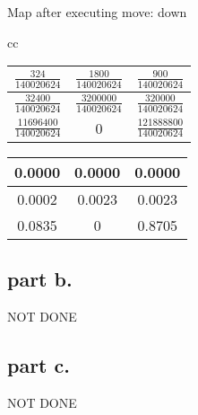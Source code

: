 Map after executing move: down
\begin{center}
\begin{tabular}{cc}%
\begin{tabular}[t]{ |c|c|c| }
 \hline
 $\frac{324}{140020624} $ & $\frac{1800}{140020624} $ & $\frac{900}{140020624} $ \\
 \hline
  $\frac{32400}{140020624}$  &  $\frac{3200000}{140020624}$  &  $\frac{320000}{140020624}$ \\
 \hline
  $\frac{11696400}{140020624}$      &  0              &  $\frac{121888800}{140020624} $\\
 \hline
\end{tabular}

\begin{tabular}[t]{ |c|c|c| }
 \hline
  0.0000   &  0.0000   & 0.0000 \\
 \hline
 0.0002   & 0.0023   & 0.0023 \\
 \hline
  0.0835   &   0   & 0.8705  \\
 \hline
\end{tabular}
\end{tabular}
\end{center}


\subsection{part b.}
NOT DONE

\subsection{part c.}
NOT DONE
